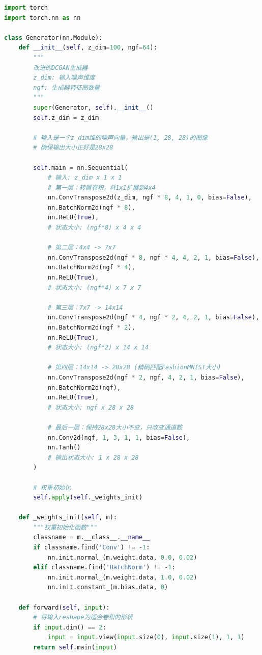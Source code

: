\documentclass[UTF8]{ctexart}
\begin{document}
\begin{lstlisting}[language=Python, caption=改进的卷积GAN生成器和判别器]
import torch
import torch.nn as nn

class Generator(nn.Module):
    def __init__(self, z_dim=100, ngf=64):
        """
        改进的DCGAN生成器
        z_dim: 输入噪声维度
        ngf: 生成器特征图数量
        """
        super(Generator, self).__init__()
        self.z_dim = z_dim
        
        # 输入是一个z_dim维的噪声向量，输出是(1, 28, 28)的图像
        # 确保输出大小正好是28x28
        
        self.main = nn.Sequential(
            # 输入: z_dim x 1 x 1
            # 第一层：转置卷积，将1x1扩展到4x4
            nn.ConvTranspose2d(z_dim, ngf * 8, 4, 1, 0, bias=False),
            nn.BatchNorm2d(ngf * 8),
            nn.ReLU(True),
            # 状态大小: (ngf*8) x 4 x 4
            
            # 第二层：4x4 -> 7x7
            nn.ConvTranspose2d(ngf * 8, ngf * 4, 4, 2, 1, bias=False),
            nn.BatchNorm2d(ngf * 4),
            nn.ReLU(True),
            # 状态大小: (ngf*4) x 7 x 7
            
            # 第三层：7x7 -> 14x14
            nn.ConvTranspose2d(ngf * 4, ngf * 2, 4, 2, 1, bias=False),
            nn.BatchNorm2d(ngf * 2),
            nn.ReLU(True),
            # 状态大小: (ngf*2) x 14 x 14
            
            # 第四层：14x14 -> 28x28 (精确匹配FashionMNIST大小)
            nn.ConvTranspose2d(ngf * 2, ngf, 4, 2, 1, bias=False),
            nn.BatchNorm2d(ngf),
            nn.ReLU(True),
            # 状态大小: ngf x 28 x 28
            
            # 最后一层：保持28x28大小不变，只改变通道数
            nn.Conv2d(ngf, 1, 3, 1, 1, bias=False),
            nn.Tanh()
            # 输出状态大小: 1 x 28 x 28
        )
        
        # 权重初始化
        self.apply(self._weights_init)
    
    def _weights_init(self, m):
        """权重初始化函数"""
        classname = m.__class__.__name__
        if classname.find('Conv') != -1:
            nn.init.normal_(m.weight.data, 0.0, 0.02)
        elif classname.find('BatchNorm') != -1:
            nn.init.normal_(m.weight.data, 1.0, 0.02)
            nn.init.constant_(m.bias.data, 0)
    
    def forward(self, input):
        # 将输入reshape为适合卷积的形状
        if input.dim() == 2:
            input = input.view(input.size(0), input.size(1), 1, 1)
        return self.main(input)


\end{lstlisting}
\end{document}
